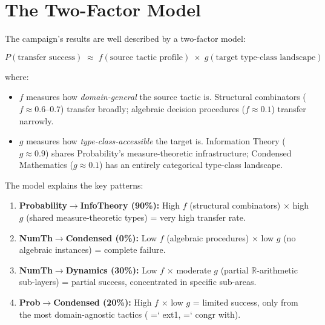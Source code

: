 \documentclass[11pt]{article}
\renewcommand{\texttt}[1]{%
  \begingroup\ttfamily\hyphenchar\font=`\-\relax
  \def\_{\textunderscore\discretionary{}{}{}}%
  #1\endgroup}
\theoremstyle{definition}
\theoremstyle{remark}
\begin{document}
\section{The Two-Factor Model}\label{sec:model}

The campaign's results are well described by a two-factor model:

\[
P(\text{transfer success}) \;\approx\;
  f(\text{source tactic profile}) \;\times\;
  g(\text{target type-class landscape})
\]

\noindent where:

\begin{itemize}
\item $f$ measures how \emph{domain-general} the source tactic is.
  Structural combinators ($f \approx 0.6$--$0.7$) transfer broadly;
  algebraic decision procedures ($f \approx 0.1$) transfer narrowly.

\item $g$ measures how \emph{type-class-accessible} the target is.
  Information Theory ($g \approx 0.9$) shares Probability's
  measure-theoretic infrastructure; Condensed Mathematics
  ($g \approx 0.1$) has an entirely categorical type-class landscape.
\end{itemize}

The model explains the key patterns:

\begin{enumerate}
\item \textbf{Probability$\to$InfoTheory (90\%):}
  High $f$ (structural combinators) $\times$ high $g$ (shared
  measure-theoretic types) = very high transfer rate.

\item \textbf{NumTh$\to$Condensed (0\%):}
  Low $f$ (algebraic procedures) $\times$ low $g$ (no algebraic
  instances) = complete failure.

\item \textbf{NumTh$\to$Dynamics (30\%):}
  Low $f$ $\times$ moderate $g$ (partial $\mathbb{R}$-arithmetic
  sub-layers) = partial success, concentrated in specific sub-areas.

\item \textbf{Prob$\to$Condensed (20\%):}
  High $f$ $\times$ low $g$ = limited success, only from the most
  domain-agnostic tactics (\texttt{ext1}, \texttt{congr with}).
\end{enumerate}
\end{document}
